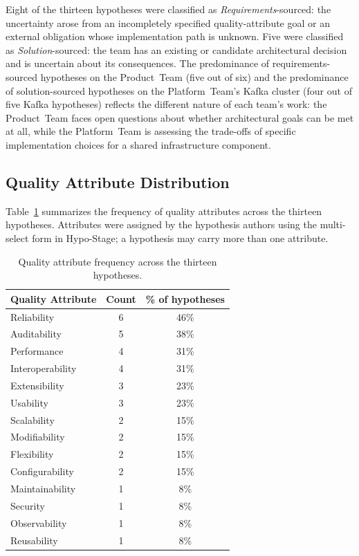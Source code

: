 Eight of the thirteen hypotheses were classified as \textit{Requirements}-sourced:
the uncertainty arose from an incompletely specified quality-attribute goal or
an external obligation whose implementation path is unknown. Five were classified
as \textit{Solution}-sourced: the team has an existing or candidate architectural
decision and is uncertain about its consequences. The predominance of
requirements-sourced hypotheses on the Product~Team (five out of six) and
the predominance of solution-sourced hypotheses on the Platform~Team's Kafka
cluster (four out of five Kafka hypotheses) reflects the different nature of
each team's work: the Product~Team faces open questions about whether architectural
goals can be met at all, while the Platform~Team is assessing the trade-offs of
specific implementation choices for a shared infrastructure component.

\subsection{Quality Attribute Distribution}
\label{subsec:qa-distribution}

Table~\ref{tab:qa-distribution} summarizes the frequency of quality attributes
across the thirteen hypotheses. Attributes were assigned by the hypothesis authors
using the multi-select form in Hypo-Stage; a hypothesis may carry more than one
attribute.

\begin{table}[htbp]
\caption{Quality attribute frequency across the thirteen hypotheses.}
\label{tab:qa-distribution}
\centering\small
\begin{tabular}{lcc}
\toprule
\textbf{Quality Attribute} & \textbf{Count} & \textbf{\% of hypotheses} \\
\midrule
Reliability        & 6 & 46\% \\
Auditability       & 5 & 38\% \\
Performance        & 4 & 31\% \\
Interoperability   & 4 & 31\% \\
Extensibility      & 3 & 23\% \\
Usability          & 3 & 23\% \\
Scalability        & 2 & 15\% \\
Modifiability      & 2 & 15\% \\
Flexibility        & 2 & 15\% \\
Configurability    & 2 & 15\% \\
Maintainability    & 1 &  8\% \\
Security           & 1 &  8\% \\
Observability      & 1 &  8\% \\
Reusability        & 1 &  8\% \\
\bottomrule
\end{tabular}
\end{table}

